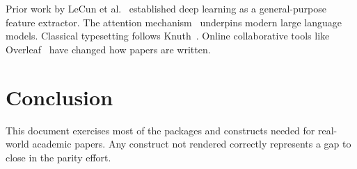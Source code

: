 \documentclass[12pt,a4paper]{article}
\begin{document}
Prior work by LeCun et al.~\cite{lecun2015} established deep learning as a
general-purpose feature extractor. The attention mechanism~\cite{vaswani2017}
underpins modern large language models. Classical typesetting follows
Knuth~\cite{knuth1984}. Online collaborative tools like Overleaf~\cite{overleaf2023}
have changed how papers are written.

\section{Conclusion}

This document exercises most of the packages and constructs needed for real-world
academic papers. Any construct not rendered correctly represents a gap to close
in the parity effort.



\end{document}
